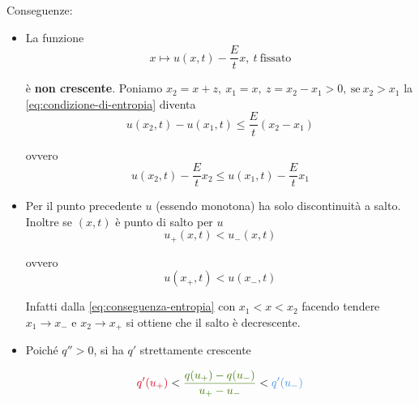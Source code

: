 \documentclass[10pt,a4paper,twoside,openright]{book}
\begin{document}
Conseguenze:
\begin{itemize}
	\item La funzione\begin{equation*}
	      x\longmapsto u( x,t) -\frac{E}{t} x,\ t\ \text{fissato}
	\end{equation*}
	
	è \textbf{non crescente}. Poniamo $\displaystyle x_{2} =x+z,\ x_{1} =x,\ z=x_{2} -x_{1}  >0,\ \text{se} \ x_{2}  >x_{1}$ la \eqref{eq:condizione-di-entropia} diventa\begin{equation*}
	u( x_{2} ,t) -u( x_{1} ,t) \leqslant \frac{E}{t}( x_{2} -x_{1})
	\end{equation*}
	
	ovvero\begin{equation}
	u( x_{2} ,t) -\frac{E}{t} x_{2} \leqslant u( x_{1} ,t) -\frac{E}{t} x_{1}
	\label{eq:conseguenza-entropia}
	\end{equation}
	\item Per il punto precedente $\displaystyle u$ (essendo monotona) ha solo discontinuità a salto. Inoltre se $\displaystyle ( x,t)$ è punto di salto per $\displaystyle u$
	      \begin{equation*}
	      	u_{+}( x,t) < u_{-}( x,t)
	      \end{equation*}
	      
	      ovvero\begin{equation*}
	      u( x_{+} ,t) < u( x_{-} ,t)
	\end{equation*}
	
	Infatti dalla \eqref{eq:conseguenza-entropia} con $\displaystyle x_{1} < x< x_{2}$ facendo tendere $\displaystyle x_{1}\rightarrow x_{-}$ e $\displaystyle x_{2}\rightarrow x_{+}$ si ottiene che il salto è decrescente.
	\item Poiché $\displaystyle q'' >0$, si ha $\displaystyle q'$ strettamente crescente

	\begin{equation*}
	\textcolor[rgb]{0.82,0.01,0.11}{q'( u_{+})} < \textcolor[rgb]{0.25,0.46,0.02}{\frac{q( u_{+}) -q( u_{-})}{u_{+} -u_{-}}} < \textcolor[rgb]{0.29,0.56,0.89}{q'( u_{-})}
	\end{equation*}

	\begin{figure}[htpb]
		\centering

		\begin{tikzpicture}[x=0.75pt,y=0.75pt,yscale=-1,xscale=1]


\end{tikzpicture}
\end{figure}
\end{itemize}
\end{document}
